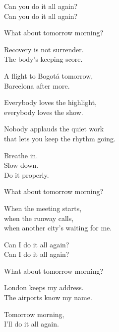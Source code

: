 \begin{lyrics}
Can you do it all again?\\
Can you do it all again?

What about tomorrow morning?


Recovery is not surrender.\\
The body's keeping score.

A flight to Bogotá tomorrow,\\
Barcelona after more.

Everybody loves the highlight,\\
everybody loves the show.

Nobody applauds the quiet work\\
that lets you keep the rhythm going.


Breathe in.\\
Slow down.\\
Do it properly.


What about tomorrow morning?

When the meeting starts,\\
when the runway calls,\\
when another city's waiting for me.

Can I do it all again?\\
Can I do it all again?

What about tomorrow morning?


London keeps my address.\\
The airports know my name.

Tomorrow morning,\\
I'll do it all again.
\end{lyrics}

